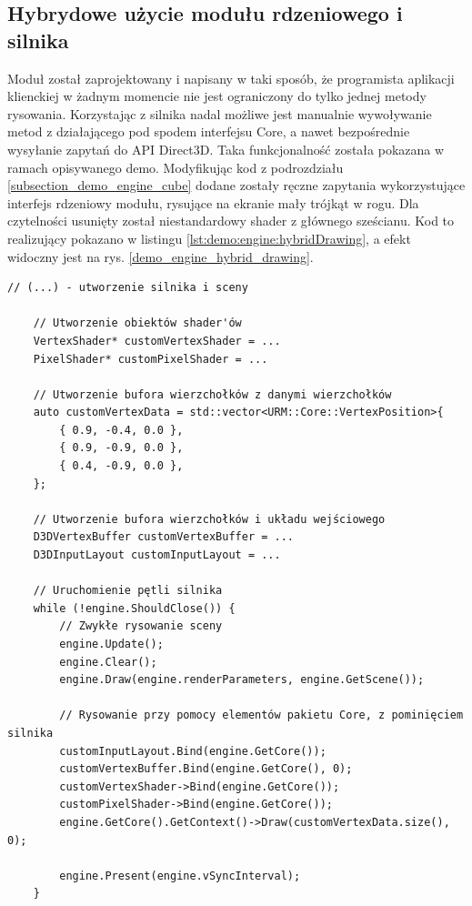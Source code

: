 \subsection{Hybrydowe użycie modułu rdzeniowego i silnika}
Moduł został zaprojektowany i napisany w taki sposób, że programista aplikacji klienckiej w żadnym momencie nie jest ograniczony do tylko jednej metody rysowania. Korzystając z silnika nadal możliwe jest manualnie wywoływanie metod z działającego pod spodem interfejsu Core, a nawet bezpośrednie wysyłanie zapytań do API Direct3D. Taka funkcjonalność została pokazana w ramach opisywanego demo. Modyfikując kod z podrozdziału \ref{subsection_demo_engine_cube} dodane zostały ręczne zapytania wykorzystujące interfejs rdzeniowy modułu, rysujące na ekranie mały trójkąt w rogu. Dla czytelności usunięty został niestandardowy shader z głównego sześcianu. Kod to realizujący pokazano w listingu \ref{lst:demo:engine:hybridDrawing}, a efekt widoczny jest na rys. \ref{demo_engine_hybrid_drawing}.

\vfill
\clearpage

\begin{lstlisting}[caption={Fragmentu kodu dema, który pokazuje możliwość hybrydowego użycia interfejsów różnych warstw modułu.}, label={lst:demo:engine:hybridDrawing}]
	// (...) - utworzenie silnika i sceny
	
	// Utworzenie obiektów shader'ów
	VertexShader* customVertexShader = ...
	PixelShader* customPixelShader = ...
	
	// Utworzenie bufora wierzchołków z danymi wierzchołków
	auto customVertexData = std::vector<URM::Core::VertexPosition>{
		{ 0.9, -0.4, 0.0 },
		{ 0.9, -0.9, 0.0 },
		{ 0.4, -0.9, 0.0 },
	};
	
	// Utworzenie bufora wierzchołków i układu wejściowego
	D3DVertexBuffer customVertexBuffer = ...
	D3DInputLayout customInputLayout = ...
	
	// Uruchomienie pętli silnika
	while (!engine.ShouldClose()) {
		// Zwykłe rysowanie sceny
		engine.Update();
		engine.Clear();
		engine.Draw(engine.renderParameters, engine.GetScene());
		
		// Rysowanie przy pomocy elementów pakietu Core, z pominięciem silnika
		customInputLayout.Bind(engine.GetCore());
		customVertexBuffer.Bind(engine.GetCore(), 0);
		customVertexShader->Bind(engine.GetCore());
		customPixelShader->Bind(engine.GetCore());
		engine.GetCore().GetContext()->Draw(customVertexData.size(), 0);
		
		engine.Present(engine.vSyncInterval);
	}
\end{lstlisting}

